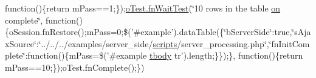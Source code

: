 \begin{DoxyCompactItemize}
function()\{return m\+Pass==1;\});\hyperlink{onhold_24__server-side_2__zero__config_8js_ab25c4d596771c0133cdc45178ce72c3d}{o\+Test.\+fn\+Wait\+Test}(\char`\"{}10 rows in the table \hyperlink{fullpage_2plugin_8min_8js_a1cfa98b7fed2aaf9fee3b68dbb7f9497}{on} complete\char`\"{}, function()\{o\+Session.\+fn\+Restore();m\+Pass=0;\$('\#example').data\+Table(\{\char`\"{}b\+Server\+Side\char`\"{}\+:true,\char`\"{}s\+Ajax\+Source\char`\"{}\+:\char`\"{}../../../examples/server\+\_\+side/\hyperlink{tinymce_8jquery_8dev_8js_a09066d4d580eeec222f858d588b4cdef}{scripts}/server\+\_\+processing.\+php\char`\"{},\char`\"{}fn\+Init\+Complete\char`\"{}\+:function()\{m\+Pass=\$('\#example \hyperlink{core_8constructor_8js_a99b0542c7c50fe8757c55bf9dac5f3be}{tbody} tr').length;\}\});\}, function()\{return m\+Pass==10;\});o\+Test.\+fn\+Complete();\})
\end{DoxyCompactItemize}



